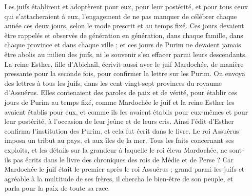 \begin{multicols}{2}
Les juifs établirent et adoptèrent pour eux, pour leur postérité, et pour tous ceux qui s’attacheraient à eux, l’engagement de ne pas manquer de célébrer chaque année ces deux jours, selon le mode prescrit et au temps fixé.
Ces jours devaient être rappelés et observés de génération en génération, dans chaque famille, dans chaque province et dans chaque ville ; et ces jours de Purim ne devaient jamais être abolis au milieu des juifs, ni le souvenir s’en effacer parmi leurs descendants.
La reine Esther, fille d'Abichaïl, écrivit aussi avec le juif Mardochée, de manière pressante pour la seconde fois, pour confirmer la lettre sur les Purim.
On envoya des lettres à tous les juifs, dans les cent vingt-sept provinces du royaume d'Assuérus. Elles contenaient des paroles de paix et de vérité,
pour établir ces jours de Purim au temps fixé, comme Mardochée le juif et la reine Esther les avaient établis pour eux, et comme ils les avaient établis pour eux-mêmes et pour leur postérité, à l’occasion de leur jeûne et de leurs cris.
Ainsi l'édit d'Esther confirma l’institution des Purim, et cela fut écrit dans le livre.
\VerseOne{}Le roi Assuérus imposa un tribut au pays, et aux îles de la mer.
Tous les faits concernant ses exploits, et les détails sur la grandeur à laquelle le roi éleva Mardochée, ne sont-ils pas écrits dans le livre des chroniques des rois de Médie et de Perse ?
Car Mardochée le juif était le premier après le roi Assuérus ; grand parmi les juifs et agréable à la multitude de ses frères, il chercha le bien-être de son peuple, et parla pour la paix de toute sa race.
\PPE{}
\end{multicols}
